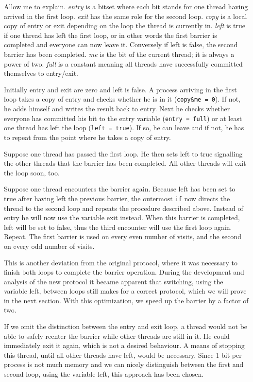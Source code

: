 \documentclass[a4paper, 10pt]{article}
\begin{document}
Allow me to explain. \emph{entry} is a bitset where each bit stands for one thread having arrived in the first loop. \emph{exit} has the same role for the second loop. \emph{copy} is a local copy of entry or exit depending on the loop the thread is currently in. \emph{left} is true if one thread has left the first loop, or in other words the first barrier is completed and everyone can now leave it. Conversely if left is false, the second barrier has been completed. \emph{me} is the bit of the current thread; it is always a power of two. \emph{full} is a constant meaning all threads have successfully committed themselves to entry/exit.

Initially entry and exit are zero and left is false. A process arriving in the first loop takes a copy of entry and checks whether he is in it (\texttt{copy\&me = 0}). If not, he adds himself and writes the result back to entry. Next he checks whether everyone has committed his bit to the entry variable (\texttt{entry = full}) or at least one thread has left the loop (\texttt{left = true}). If so, he can leave and if not, he has to repeat from the point where he takes a copy of entry.

Suppose one thread has passed the first loop. He then sets left to true signalling the other threads that the barrier has been completed. All other threads will exit the loop soon, too.

Suppose one thread encounters the barrier again. Because left has been set to true after having left the previous barrier, the outermost \texttt{if} now directs the thread to the second loop and repeats the procedure described above. Instead of entry he will now use the variable exit instead. When this barrier is completed, left will be set to false, thus the third encounter will use the first loop again. Repeat. The first barrier is used on every even number of visits, and the second on every odd number of visits.

This is another deviation from the original protocol, where it was necessary to finish both loops to complete the barrier operation. During the development and analysis of the new protocol it became apparent that switching, using the variable left, between loops still makes for a correct protocol, which we will prove in the next section. With this optimization, we speed up the barrier by a factor of two.

If we omit the distinction between the entry and exit loop, a thread would not be able to safely reenter the barrier while other threads are still in it. He could immediately exit it again, which is not a desired behaviour. A means of stopping this thread, until all other threads have left, would be necessary. Since 1 bit per process is not much memory and we can nicely distinguish between the first and second loop, using the variable left, this approach has been chosen.
\end{document}
